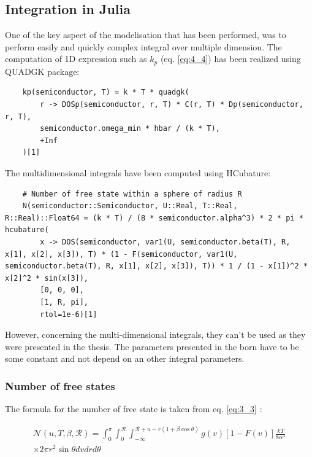 \subsection{Integration in Julia}

One of the key aspect of the modelisation that has been performed, was to perform easily and quickly complex integral over multiple dimension. The computation of 1D expression such as $k_p$ (eq. \ref{eq:4_4}) has been realized using QUADGK package:

\begin{lstlisting}
    kp(semiconductor, T) = k * T * quadgk(
        r -> DOSp(semiconductor, r, T) * C(r, T) * Dp(semiconductor, r, T),
        semiconductor.omega_min * hbar / (k * T),
        +Inf
    )[1]
\end{lstlisting}

The multidimensional integrals have been computed using HCubature:

\begin{lstlisting}
    # Number of free state within a sphere of radius R
    N(semiconductor::Semiconductor, U::Real, T::Real, R::Real)::Float64 = (k * T) / (8 * semiconductor.alpha^3) * 2 * pi * hcubature(
        x -> DOS(semiconductor, var1(U, semiconductor.beta(T), R, x[1], x[2], x[3]), T) * (1 - F(semiconductor, var1(U, semiconductor.beta(T), R, x[1], x[2], x[3]), T)) * 1 / (1 - x[1])^2 * x[2]^2 * sin(x[3]),
        [0, 0, 0],
        [1, R, pi],
        rtol=1e-6)[1]
\end{lstlisting}

However, concerning the multi-dimensional integrals, they can't be used as they were presented in the thesis. The parameters presented in the born have to be some constant and not depend on an other integral parameters.

\subsubsection{Number of free states\label{sec:free_states}}

The formula for the number of free state is taken from eq. \ref{eq:3_3} :

\begin{equation}
    \begin{aligned}
    \mathcal{N}\left(u, T, \beta, \mathscr{R}\right)=\int_{0}^{\pi} \int_{0}^{\mathscr{R}} \int_{-\infty}^{\mathscr{R}+u-r(1+\beta \cos \theta)} g\left(v\right)\left[1-F\left(v\right)\right] \frac{k T}{8 \alpha^{3}} \\
    \times 2 \pi r^2 \sin \theta d v d r d \theta
    \end{aligned}
    \label{eq:2_1}
\end{equation}


